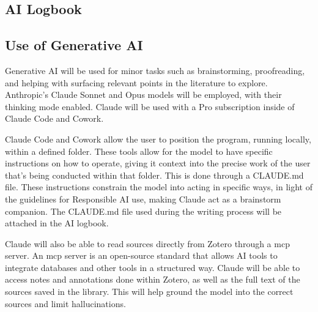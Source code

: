 \begin{appendices}
\renewcommand{\thesection}{\Roman{section}}
\renewcommand{\thesubsection}{\thesection.\Alph{subsection}}
\section{AI Logbook}

\subsection{Use of Generative AI}

Generative AI will be used for minor tasks such as brainstorming, proofreading, and helping with surfacing relevant points in the literature to explore. 
Anthropic's Claude Sonnet and Opus models will be employed, with their thinking mode enabled. 
Claude will be used with a Pro subscription inside of Claude Code\autocite{HowClaudeCode} and Cowork.\autocite{GetStartedCowork}

Claude Code and Cowork allow the user to position the program, running locally, within a defined folder.\autocite{HowClaudeCode}
These tools allow for the model to have specific instructions on how to operate, giving it context into the precise work of the user that's being conducted within that folder.\autocite{HowClaudeRemembers}
This is done through a CLAUDE.md file.\autocite{HowClaudeRemembers}
These instructions constrain the model into acting in specific ways, in light of the guidelines for Responsible AI use, making Claude act as a brainstorm companion.
The CLAUDE.md file used during the writing process will be attached in the AI logbook.

Claude will also be able to read sources directly from Zotero through a \gls{mcp} server.\autocite{yu54yyyuZoteromcp2026}
An \gls{mcp} server is an open-source standard that allows AI tools to integrate databases and other tools in a structured way.\autocite{WhatModelContext}
Claude will be able to access notes and annotations done within Zotero, as well as the full text of the sources saved in the library.
This will help ground the model into the correct sources and limit hallucinations.

\end{appendices}